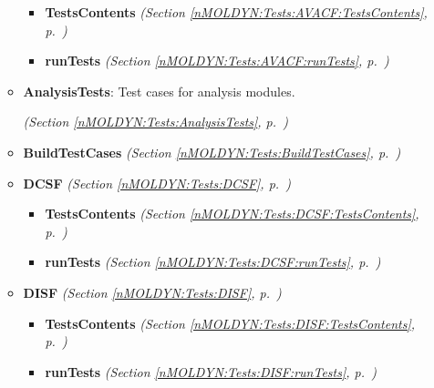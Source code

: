 \begin{itemize}
\begin{itemize}
      \begin{itemize}
    \setlength{\parskip}{0ex}
        \item \textbf{TestsContents}
  \textit{(Section \ref{nMOLDYN:Tests:AVACF:TestsContents}, p.~\pageref{nMOLDYN:Tests:AVACF:TestsContents})}

        \item \textbf{runTests}
  \textit{(Section \ref{nMOLDYN:Tests:AVACF:runTests}, p.~\pageref{nMOLDYN:Tests:AVACF:runTests})}

      \end{itemize}
    \item \textbf{AnalysisTests}: Test cases for analysis modules.



  \textit{(Section \ref{nMOLDYN:Tests:AnalysisTests}, p.~\pageref{nMOLDYN:Tests:AnalysisTests})}

    \item \textbf{BuildTestCases}
  \textit{(Section \ref{nMOLDYN:Tests:BuildTestCases}, p.~\pageref{nMOLDYN:Tests:BuildTestCases})}

    \item \textbf{DCSF}
  \textit{(Section \ref{nMOLDYN:Tests:DCSF}, p.~\pageref{nMOLDYN:Tests:DCSF})}

      \begin{itemize}
    \setlength{\parskip}{0ex}
        \item \textbf{TestsContents}
  \textit{(Section \ref{nMOLDYN:Tests:DCSF:TestsContents}, p.~\pageref{nMOLDYN:Tests:DCSF:TestsContents})}

        \item \textbf{runTests}
  \textit{(Section \ref{nMOLDYN:Tests:DCSF:runTests}, p.~\pageref{nMOLDYN:Tests:DCSF:runTests})}

      \end{itemize}
    \item \textbf{DISF}
  \textit{(Section \ref{nMOLDYN:Tests:DISF}, p.~\pageref{nMOLDYN:Tests:DISF})}

      \begin{itemize}
    \setlength{\parskip}{0ex}
        \item \textbf{TestsContents}
  \textit{(Section \ref{nMOLDYN:Tests:DISF:TestsContents}, p.~\pageref{nMOLDYN:Tests:DISF:TestsContents})}

        \item \textbf{runTests}
  \textit{(Section \ref{nMOLDYN:Tests:DISF:runTests}, p.~\pageref{nMOLDYN:Tests:DISF:runTests})}


\end{itemize}
\end{itemize}
\end{itemize}
